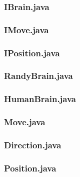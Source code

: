 \documentclass [12pt ,a4paper, naustrian]{scrartcl}
\theoremstyle{plain}
\theoremstyle{definition}
\theoremstyle{remark}
\begin{document}
\subsubsection*{IBrain.java}


\subsubsection*{IMove.java}


\subsubsection*{IPosition.java}


\subsubsection*{RandyBrain.java}


\subsubsection*{HumanBrain.java}


\subsubsection*{Move.java}


\subsubsection*{Direction.java}


\subsubsection*{Position.java}

\end{document}
